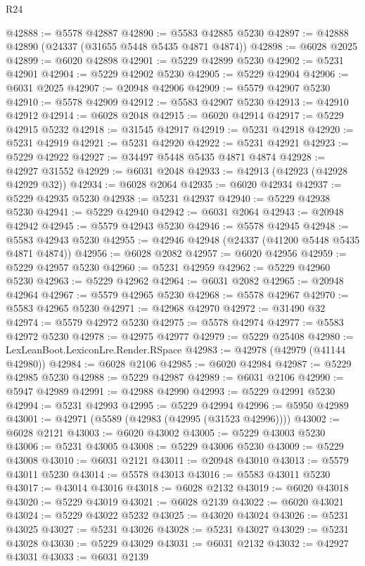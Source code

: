 \begin{lexlean}{R24}
\begin{coremodule}
@42888 := @5578 @42887
@42890 := @5583 @42885 @5230
@42897 := @42888 @42890 (@24337 (@31655 @5448 @5435 @4871 @4874))
@42898 := @6028 @2025
@42899 := @6020 @42898
@42901 := @5229 @42899 @5230
@42902 := @5231 @42901
@42904 := @5229 @42902 @5230
@42905 := @5229 @42904
@42906 := @6031 @2025
@42907 := @20948 @42906
@42909 := @5579 @42907 @5230
@42910 := @5578 @42909
@42912 := @5583 @42907 @5230
@42913 := @42910 @42912
@42914 := @6028 @2048
@42915 := @6020 @42914
@42917 := @5229 @42915 @5232
@42918 := @31545 @42917
@42919 := @5231 @42918
@42920 := @5231 @42919
@42921 := @5231 @42920
@42922 := @5231 @42921
@42923 := @5229 @42922
@42927 := @34497 @5448 @5435 @4871 @4874
@42928 := @42927 @31552
@42929 := @6031 @2048
@42933 := @42913 (@42923 (@42928 @42929 @32))
@42934 := @6028 @2064
@42935 := @6020 @42934
@42937 := @5229 @42935 @5230
@42938 := @5231 @42937
@42940 := @5229 @42938 @5230
@42941 := @5229 @42940
@42942 := @6031 @2064
@42943 := @20948 @42942
@42945 := @5579 @42943 @5230
@42946 := @5578 @42945
@42948 := @5583 @42943 @5230
@42955 := @42946 @42948 (@24337 (@41200 @5448 @5435 @4871 @4874))
@42956 := @6028 @2082
@42957 := @6020 @42956
@42959 := @5229 @42957 @5230
@42960 := @5231 @42959
@42962 := @5229 @42960 @5230
@42963 := @5229 @42962
@42964 := @6031 @2082
@42965 := @20948 @42964
@42967 := @5579 @42965 @5230
@42968 := @5578 @42967
@42970 := @5583 @42965 @5230
@42971 := @42968 @42970
@42972 := @31490 @32
@42974 := @5579 @42972 @5230
@42975 := @5578 @42974
@42977 := @5583 @42972 @5230
@42978 := @42975 @42977
@42979 := @5229 @25408
@42980 := LexLeanBoot.LexiconLre.Render.RSpace
@42983 := @42978 (@42979 (@41144 @42980))
@42984 := @6028 @2106
@42985 := @6020 @42984
@42987 := @5229 @42985 @5230
@42988 := @5229 @42987
@42989 := @6031 @2106
@42990 := @5947 @42989
@42991 := @42988 @42990
@42993 := @5229 @42991 @5230
@42994 := @5231 @42993
@42995 := @5229 @42994
@42996 := @5950 @42989
@43001 := @42971 (@5589 (@42983 (@42995 (@31523 @42996))))
@43002 := @6028 @2121
@43003 := @6020 @43002
@43005 := @5229 @43003 @5230
@43006 := @5231 @43005
@43008 := @5229 @43006 @5230
@43009 := @5229 @43008
@43010 := @6031 @2121
@43011 := @20948 @43010
@43013 := @5579 @43011 @5230
@43014 := @5578 @43013
@43016 := @5583 @43011 @5230
@43017 := @43014 @43016
@43018 := @6028 @2132
@43019 := @6020 @43018
@43020 := @5229 @43019
@43021 := @6028 @2139
@43022 := @6020 @43021
@43024 := @5229 @43022 @5232
@43025 := @43020 @43024
@43026 := @5231 @43025
@43027 := @5231 @43026
@43028 := @5231 @43027
@43029 := @5231 @43028
@43030 := @5229 @43029
@43031 := @6031 @2132
@43032 := @42927 @43031
@43033 := @6031 @2139

\end{coremodule}
\end{lexlean}
